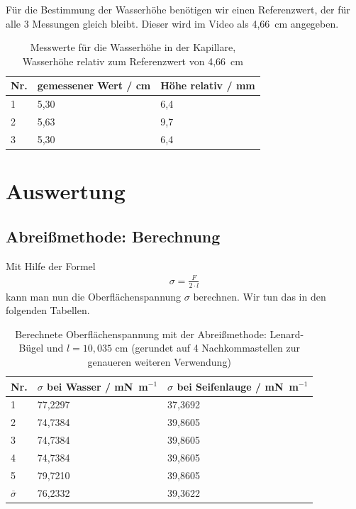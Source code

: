 \documentclass{article}
\begin{document}
Für die Bestimmung der Wasserhöhe benötigen wir einen Referenzwert, der für alle 3 Messungen gleich bleibt. Dieser wird im Video als 4,66~cm angegeben.

\begin{table}[H]
\caption{Messwerte für die Wasserhöhe in der Kapillare, Wasserhöhe relativ zum Referenzwert von 4,66~cm}
\begin{tabular}{lll}
Nr. & gemessener Wert / cm & Höhe relativ / mm\\
\hline
1 & 5,30 & 6,4 \\
2 & 5,63 & 9,7 \\
3 & 5,30 & 6,4
\end{tabular}
\end{table}


\newpage
\section{Auswertung}

\subsection{Abreißmethode: Berechnung}

Mit Hilfe der Formel 
\begin{align*}
\sigma = \frac{F}{2\cdot l}
\end{align*}
kann man nun die Oberflächenspannung $\sigma$ berechnen. Wir tun das in den folgenden Tabellen.

\begin{table}[h]
\caption{Berechnete Oberflächenspannung mit der Abreißmethode: Lenard-Bügel und $l=10,035$ cm (gerundet auf 4 Nachkommastellen zur genaueren weiteren Verwendung)}
\begin{tabular}{lll}
Nr. & \shortstack[l]{$\sigma$ bei\\Wasser / mN~m${}^{-1}$} & \shortstack[l]{$\sigma$ bei\\Seifenlauge / mN~m${}^{-1}$} \\
\hline
1 & 77,2297 & 37,3692 \\
2 & 74,7384 & 39,8605 \\
3 & 74,7384 & 39,8605 \\
4 & 74,7384 & 39,8605 \\
5 & 79,7210 & 39,8605 \\
\hline
$\overline{\sigma}$ & 76,2332 & 39,3622
\end{tabular}
\end{table}
\end{document}
